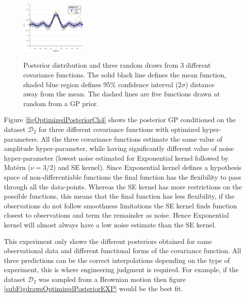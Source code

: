 \begin{figure}[!ht]
  {
        \includegraphics[width=0.29\textwidth]
        {imagesPart2/drawsPosteriorSE}
        \label{subFigdrawsPosteriorSE}
  }\quad
\caption{Posterior distribution and three random draws from 3 different covariance functions. The solid black line defines the mean function, shaded blue region defines 95\% confidence interval (2$\sigma$) distance away from the mean. The dashed lines are five functions drawn at random from a GP prior. }
       \label{figpreOptimizedPosteriorCh5}
\end{figure}


Figure \ref{figOptimizedPosteriorCh4} shows the posterior GP conditioned on the dataset $\mathcal{D}_{2}$ for three different covariance functions with optimized hyper-parameters. All the three covariance functions estimate the same value of amplitude hyper-parameter, while having significantly different value of noise hyper-parameter (lowest noise estimated for Exponential kernel followed by Mat\'ern ($\nu=3/2$) and SE kernel). Since Exponential kernel defines a hypothesis space of non-differentiable functions the final function has the flexibility to pass through all the data-points. Whereas the SE kernel has more restrictions on the possible functions, this means that the final function has less flexibility, if the observations do not follow smoothness limitations the SE kernel finds function closest to observations and term the remainder as noise. Hence Exponential kernel will almost always have a low noise estimate than the SE kernel.

This experiment only shows the different posteriors obtained for same observational data and different functional forms of the covariance function. All three predictions can be the correct interpolations depending on the type of experiment, this is where engineering judgment is required. For example, if the dataset $\mathcal{D}_{2}$ was sampled from a Brownian motion then figure \ref{subFigdrawsOptimizedPosteriorEXP} would be the best fit. 

